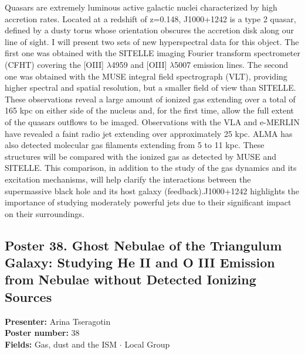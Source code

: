 Quasars are extremely luminous active galactic nuclei characterized by high accretion rates. Located at a redshift of z=0.148, J1000+1242 is a type 2 quasar, defined by a dusty torus whose orientation obscures the accretion disk along our line of sight. I will present two sets of new hyperspectral data for this object. The first one was obtained with the SITELLE imaging Fourier transform spectrometer (CFHT) covering the [OIII] $\lambda$4959 and [OIII] $\lambda$5007 emission lines. The second one was obtained with the MUSE integral field spectrograph (VLT), providing higher spectral and spatial resolution, but a smaller field of view than SITELLE. These observations reveal a large amount of ionized gas extending over a total of 165 kpc on either side of the nucleus and, for the first time, allow the full extent of the quasars outflows to be imaged. Observations with the VLA and e-MERLIN have revealed a faint radio jet extending over approximately 25 kpc. ALMA has also detected molecular gas filaments extending from 5 to 11 kpc. These structures will be compared with the ionized gas as detected by MUSE and SITELLE. This comparison, in addition to the study of the gas dynamics and its excitation mechanisms, will help clarify the interactions between the supermassive black hole and its host galaxy (feedback).J1000+1242 highlights the importance of studying moderately powerful jets due to their significant impact on their surroundings.

\hypertarget{poster-abstract-talk-242}{}\label{poster-abstract-page-talk-242}
\subsection*{Poster 38. Ghost Nebulae of the Triangulum Galaxy: Studying He II and O III Emission from Nebulae without Detected Ionizing Sources}
\textbf{Presenter:} Arina Tseragotin\\
\textbf{Poster number:} 38\\
\textbf{Fields:} Gas, dust and the ISM $\cdot$ Local Group

